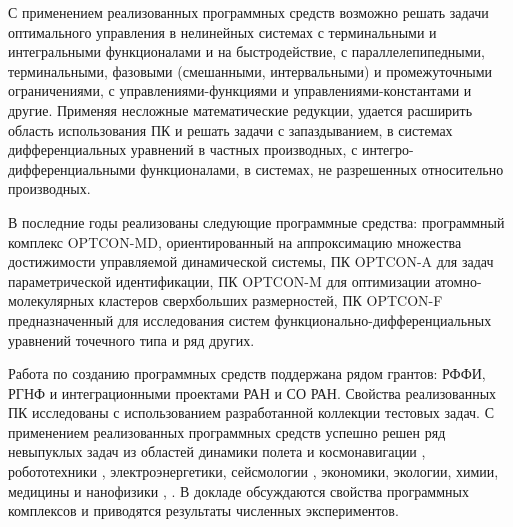 С применением реализованных программных средств возможно решать задачи оптимального управления в нелинейных системах с терминальными и интегральными функционалами и на быстродействие, с параллелепипедными, терминальными, фазовыми (смешанными, интервальными) и промежуточными ограничениями, с управлениями-функциями и управлениями-кон\-стан\-та\-ми и другие. Применяя несложные математические редукции, удается расширить область использования ПК и решать задачи с запаздыванием, в системах дифференциальных уравнений в частных производных, с интегро-дифференциальными функционалами, в системах, не разрешенных относительно производных. 

В последние годы реализованы следующие программные средства: программный комплекс OPTCON-MD, ориентированный на аппроксимацию множества достижимости уп\-равляемой динамической системы, ПК OPTCON-A для задач параметрической идентификации, ПК OPTCON-M для оптимизации атомно-молекулярных кластеров сверхбольших размерностей, ПК OPTCON-F предназначенный для исследования систем функцио\-нально-дифференциальных уравнений точечного типа и ряд других.

Работа по созданию программных средств поддержана рядом грантов: РФФИ, РГНФ и интеграционными проектами РАН и СО РАН. Свойства реализованных ПК исследованы с использованием разработанной коллекции тестовых задач. С применением реализованных программных средств успешно решен ряд невыпуклых задач из областей динамики полета и космонавигации \cite{Gor16}, робототехники \cite{Sor}, электроэнергетики, сейсмологии \cite{Ber}, экономики, экологии, химии, медицины \cite{Gor18} и нанофизики \cite{Sham}, \cite{Nen}. В докладе обсуждаются свойства программных комплексов и приводятся результаты численных экспериментов.





